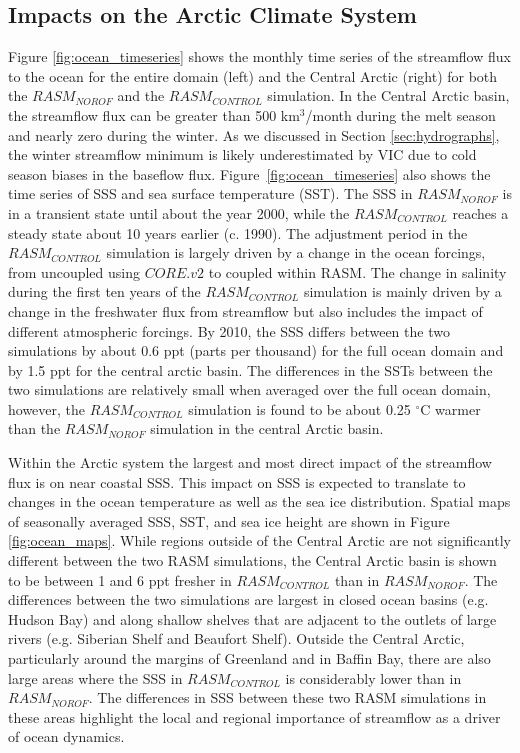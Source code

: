 \documentclass[jgrga, draft]{agutex}
\begin{document}
\begin{article}
\subsection{Impacts on the Arctic Climate System}
\label{sec:ocean}
Figure \ref{fig:ocean_timeseries} shows the monthly time series of the streamflow flux to the ocean for the entire domain (left) and the Central Arctic (right) for both the $RASM_{NOROF}$ and the $RASM_{CONTROL}$ simulation.
In the Central Arctic basin, the streamflow flux can be greater than 500 km$^3$/month during the melt season and nearly zero during the winter.
As we discussed in Section \ref{sec:hydrographs}, the winter streamflow minimum is likely underestimated by VIC due to cold season biases in the baseflow flux.
Figure~\ref{fig:ocean_timeseries} also shows the time series of SSS and sea surface temperature (SST).
The SSS in $RASM_{NOROF}$ is in a transient state until about the year 2000, while the $RASM_{CONTROL}$ reaches a steady state about 10 years earlier (c. 1990).
The adjustment period in the $RASM_{CONTROL}$ simulation is largely driven by a change in the ocean forcings, from uncoupled using $CORE.v2$ to coupled within RASM. %
The change in salinity during the first ten years of the $RASM_{CONTROL}$ simulation is mainly driven by a change in the freshwater flux from streamflow but also includes the impact of different atmospheric forcings. %
By 2010, the SSS differs between the two simulations by about 0.6 ppt (parts per thousand) for the full ocean domain and by 1.5 ppt for the central arctic basin. %
The differences in the SSTs between the two simulations are relatively small when averaged over the full ocean domain, however, the $RASM_{CONTROL}$ simulation is found to be about 0.25 $^{\circ}$C warmer than the $RASM_{NOROF}$ simulation in the central Arctic basin.

Within the Arctic system the largest and most direct impact of the streamflow flux is on near coastal SSS.
This impact on SSS is expected to translate to changes in the ocean temperature as well as the sea ice distribution.
Spatial maps of seasonally averaged SSS, SST, and sea ice height are shown in Figure \ref{fig:ocean_maps}.
While regions outside of the Central Arctic are not significantly different between the two RASM simulations, the Central Arctic basin is shown to be between 1 and 6 ppt fresher in $RASM_{CONTROL}$ than in $RASM_{NOROF}$.
The differences between the two simulations are largest in closed ocean basins (e.g. Hudson Bay) and along shallow shelves that are adjacent to the outlets of large rivers (e.g. Siberian Shelf and Beaufort Shelf).
Outside the Central Arctic, particularly around the margins of Greenland and in Baffin Bay, there are also large areas where the SSS in $RASM_{CONTROL}$ is considerably lower than in $RASM_{NOROF}$.
The differences in SSS between these two RASM simulations in these areas highlight the local and regional importance of streamflow as a driver of ocean dynamics.


\end{article}
\end{document}
